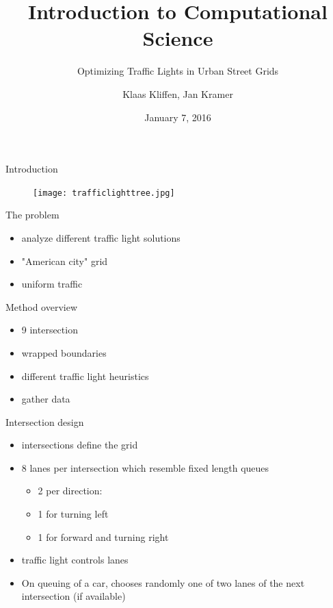 \documentclass[11pt]{beamer}
\title{Introduction to Computational Science}
\subtitle{Optimizing Traffic Lights in Urban Street Grids}
\author{Klaas Kliffen, Jan Kramer}
\date{January 7, 2016}
\begin{document}
\maketitle

\begin{frame}{Introduction}
\begin{figure}
\centering
\texttt{[image: trafficlighttree.jpg]}
\end{figure}
\end{frame}

\begin{frame}{The problem}
\begin{itemize}
    \item analyze different traffic light solutions
    \item "American city" grid
    \item uniform traffic
\end{itemize}
\end{frame}

\begin{frame}{Method overview}
\begin{itemize}
    \item 9 intersection
    \item wrapped boundaries
    \item different traffic light heuristics
    \item gather data
\end{itemize}
\end{frame}

\begin{frame}{Intersection design}

\begin{itemize}
 \item intersections define the grid
 \item 8 lanes per intersection which resemble fixed length queues
 \begin{itemize}
  \item 2 per direction:
  \item 1 for turning left
  \item 1 for forward and turning right
 \end{itemize}
 \item traffic light controls lanes
 \item On queuing of a car, chooses randomly one of two lanes of the next intersection (if available)

\end{itemize}
\end{frame}
\end{document}
